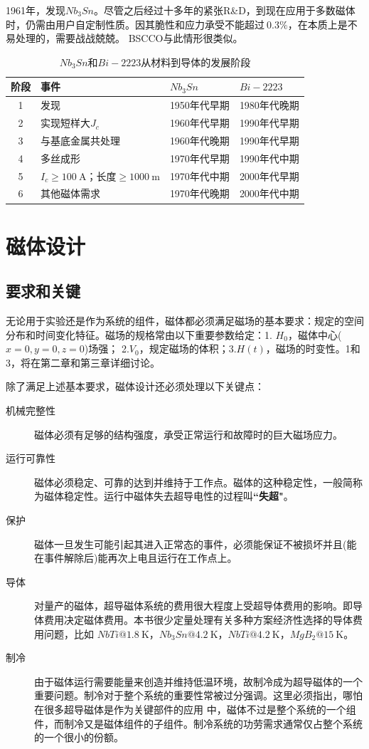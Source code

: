 1961年，发现$Nb_3Sn$。尽管之后经过十多年的紧张R\&D，到现在应用于多数磁体时，仍需由用户自定制性质。因其脆性和应力承受不能超过$~0.3\%$，在本质上是不易处理的，需要战战兢兢。
BSCCO与此情形很类似。
\begin{table}[htbp]\small
  \centering
  \caption{$Nb_3Sn$和$Bi-2223$从材料到导体的发展阶段} \label{scstage}
\begin{tabular}{|c||l|l|l|}
  \hline
  阶段&事件& $Nb_3Sn$ &$Bi-2223$ \\ \hline \hline
1 & 发现 & 1950年代早期& 1980年代晚期 \\ \hline
2 & 实现短样大$J_c$ & 1960年代早期 & 1990年代早期\\ \hline
3 &与基底金属共处理&1960年代晚期&1990年代早期\\ \hline
4 &多丝成形&1970年代早期&1990年代中期\\ \hline
5 &$I_c\ge 100\ \mathrm{A}$；长度$\ge 1000\ \mathrm{m}$ &1970年代中期&2000年代早期\\ \hline
6 &其他磁体需求&1970年代晚期&2000年代中期\\
  \hline
\end{tabular}
\end{table}


\section{磁体设计}
\subsection{要求和关键}
无论用于实验还是作为系统的组件，磁体都必须满足磁场的基本要求：规定的空间分布和时间变化特征。磁场的规格常由以下重要参数给定：1. $H_0$，磁体中心($x=0, y=0, z=0$)场强；
2.$V_0$，规定磁场的体积；3.$H(t)$，磁场的时变性。1和3，将在第二章和第三章详细讨论。

除了满足上述基本要求，磁体设计还必须处理以下关键点：
\begin{description}
  \item[机械完整性] 磁体必须有足够的结构强度，承受正常运行和故障时的巨大磁场应力。
  \item[运行可靠性] 磁体必须稳定、可靠的达到并维持于工作点。磁体的这种稳定性，一般简称为磁体稳定性。运行中磁体失去超导电性的过程叫\textbf{``失超"}。
  \item[保护] 磁体一旦发生可能引起其进入正常态的事件，必须能保证不被损坏并且(能在事件解除后)能再次上电且运行在工作点上。
  \item[导体] 对量产的磁体，超导磁体系统的费用很大程度上受超导体费用的影响。即导体费用决定磁体费用。本书很少定量处理有关多种方案经济性选择的导体费用问题，比如
$NbTi@1.8\ \mathrm{K}$，$Nb_3Sn@4.2\ \mathrm{K}$，$NbTi@4.2\ \mathrm{K}$，$MgB_2@15\ \mathrm{K}$。
  \item[制冷] 由于磁体运行需要能量来创造并维持低温环境，故制冷成为超导磁体的一个重要问题。制冷对于整个系统的重要性常被过分强调。这里必须指出，哪怕在很多超导磁体是作为关键部件的应用
  中，磁体不过是整个系统的一个组件，而制冷又是磁体组件的子组件。制冷系统的功劳需求通常仅占整个系统的一个很小的份额。
\end{description}

